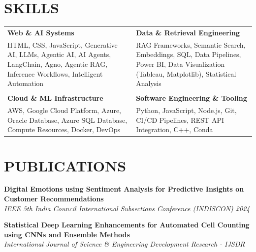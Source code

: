 \documentclass[a4paper,11pt]{article}
\newcommand{\safehref}[2]{#2}
\let\href\safehref
\newcommand{\extlink}{\raisebox{0.2ex}{\scriptsize\faExternalLink*}}
\begin{document}
\section*{SKILLS}
\setlength{\tabcolsep}{10pt}
\renewcommand{\arraystretch}{1.0}
\begin{tabularx}{\textwidth}{@{}>{\RaggedRight\arraybackslash}X >{\RaggedRight\arraybackslash}X@{}}
  \textbf{Web \& AI Systems} & \textbf{Data \& Retrieval Engineering} \\
  HTML, CSS, JavaScript, Generative AI, LLMs, Agentic AI, AI Agents, LangChain, Agno, Agentic RAG, Inference Workflows, Intelligent Automation &
  RAG Frameworks, Semantic Search, Embeddings, SQL, Data Pipelines, Power BI, Data Visualization (Tableau, Matplotlib), Statistical Analysis \\
  \\[-3pt]
  \textbf{Cloud \& ML Infrastructure} & \textbf{Software Engineering \& Tooling} \\
  AWS, Google Cloud Platform, Azure, Oracle Database, Azure SQL Database, Compute Resources, Docker, DevOps &
  Python, JavaScript, Node.js, Git, CI/CD Pipelines, REST API Integration, C++, Conda \\
\end{tabularx}

\section*{PUBLICATIONS}
\sloppy
\noindent\textbf{\href{https://example.com}{Digital Emotions using Sentiment Analysis for Predictive Insights on Customer Recommendations\ \extlink}}\\
\textit{IEEE 5th India Council International Subsections Conference (INDISCON) 2024}

\vspace{0.2cm}
\noindent\textbf{\href{https://example.com}{Statistical Deep Learning Enhancements for Automated Cell Counting using CNNs and Ensemble Methods\ \extlink}}\\
\textit{International Journal of Science \& Engineering Development Research - IJSDR}
\fussy
\end{document}
